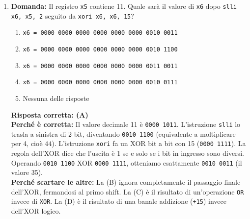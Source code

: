\documentclass[12pt, a4paper]{article}
\begin{document}
\begin{enumerate}
    \item \textbf{Domanda:} Il registro \texttt{x5} contiene 11. Quale sarà il valore di \texttt{x6} dopo \texttt{slli x6, x5, 2} seguito da \texttt{xori x6, x6, 15}?
    \begin{enumerate}[label=(\Alph*)]
        \item \texttt{x6 = 0000 0000 0000 0000 0000 0000 0010 0011}
        \item \texttt{x6 = 0000 0000 0000 0000 0000 0000 0010 1100}
        \item \texttt{x6 = 0000 0000 0000 0000 0000 0000 0011 0011}
        \item \texttt{x6 = 0000 0000 0000 0000 0000 0000 0010 0111}
        \item Nessuna delle risposte
    \end{enumerate}
    \textbf{Risposta corretta: (A)} \\
    \textbf{Perché è corretta:} Il valore decimale 11 è \texttt{0000 1011}. L'istruzione \texttt{slli} lo trasla a sinistra di 2 bit, diventando \texttt{0010 1100} (equivalente a moltiplicare per 4, cioè $44$). L'istruzione \texttt{xori} fa un XOR bit a bit con 15 (\texttt{0000 1111}). La regola dell'XOR dice che l'uscita è 1 se e solo se i bit in ingresso sono diversi. Operando \texttt{0010 1100} XOR \texttt{0000 1111}, otteniamo esattamente \texttt{0010 0011} (il valore 35). \\
    \textbf{Perché scartare le altre:} La (B) ignora completamente il passaggio finale dell'XOR, fermandosi al primo shift. La (C) è il risultato di un'operazione \texttt{OR} invece di \texttt{XOR}. La (D) è il risultato di una banale addizione (\texttt{+15}) invece dell'XOR logico.


\end{enumerate}
\end{document}
